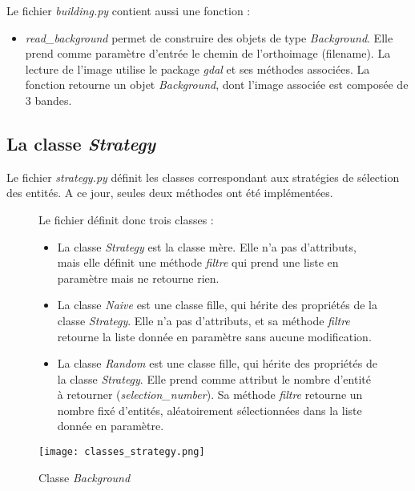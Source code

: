 \noindent Le fichier \textit{building.py} contient aussi une fonction :
\begin{itemize}[label=$\rightarrow$]
	\item \textit{read\_background} permet de construire des objets de type \textit{Background}. Elle prend comme paramètre d'entrée le chemin de l'orthoimage (filename). La lecture de l'image utilise le package \textit{gdal} et ses méthodes associées. La fonction retourne un objet \textit{Background}, dont l'image associée est composée de 3 bandes.
\end{itemize}

\subsection{La classe \textit{Strategy}}

\indent Le fichier \textit{strategy.py} définit les classes correspondant aux stratégies de sélection des entités. A ce jour, seules deux méthodes ont été implémentées.\\

\begin{figure}[!h]
	\begin{minipage}{0.58\linewidth}\parindent12pt
		\noindent Le fichier définit donc trois classes :
		\begin{itemize}[label=$\rightarrow$]
			\item La classe \textit{Strategy} est la classe mère. Elle n'a pas d'attributs, mais elle définit une méthode \textit{filtre} qui prend une liste en paramètre mais ne retourne rien.
			\item La classe  \textit{Naive} est une classe fille, qui hérite des propriétés de la classe \textit{Strategy}. Elle n'a pas d'attributs, et sa méthode \textit{filtre}  retourne la liste donnée en paramètre sans aucune modification.
			\item La classe \textit{Random} est une classe fille, qui hérite des propriétés de la classe \textit{Strategy}. Elle prend comme attribut le nombre d'entité à retourner (\textit{selection\_number}). Sa méthode \textit{filtre} retourne un nombre fixé d'entités, aléatoirement sélectionnées dans la liste donnée en paramètre.\\
		\end{itemize}
	\end{minipage}
	\hfill
	\begin{minipage}{0.40\linewidth}
		\centering
		\texttt{[image: classes\_strategy.png]}  \\
		\caption[Classe \textit{Background}]{Classe \textit{Background}}
		\label{fig:classestrat}
	\end{minipage}
\end{figure}


